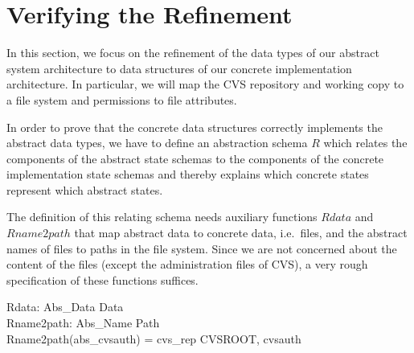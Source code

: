 \section{Verifying the Refinement}
\label{sec:refinement}

\vspace{1ex}\noindent

In this section, we focus on the refinement of the data types of our abstract
system architecture to data structures of our concrete implementation
architecture.  In particular, we will map the CVS repository and working copy to
a \unix file system and permissions to file attributes.

In order to prove that the concrete data structures correctly implements the
abstract data types, we have to define an abstraction schema $R$ which relates
the components of the abstract state schemas to the components of the concrete
implementation state schemas and thereby explains which concrete states
represent which abstract states.

The definition of this relating schema needs auxiliary functions $Rdata$ and
$Rname2path$ that map abstract data to concrete data, i.e.\ files, and the
abstract names of files to paths in the \unix file system.  Since we are not
concerned about the content of the files (except the administration files of
CVS), a very rough specification of these functions suffices.
\begin{axdef}
  Rdata: Abs\_Data \bij Data \\
  Rname2path: Abs\_Name \bij Path \\
  \where
  Rname2path(abs\_cvsauth) = cvs\_rep \cat \langle CVSROOT, cvsauth \rangle \\
\end{axdef}

